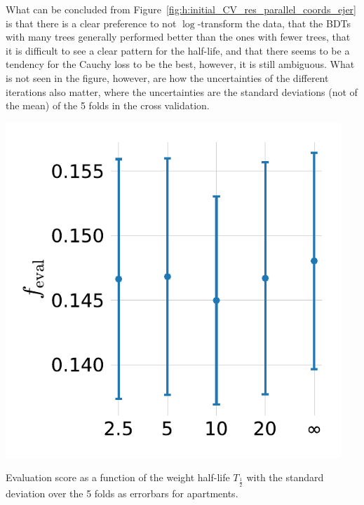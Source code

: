 What can be concluded from Figure~\ref{fig:h:initial_CV_res_parallel_coords_ejer} is that there is a clear preference to not $\log$-transform the data, that the BDTs with many trees generally performed better than the ones with fewer trees, that it is difficult to see a clear pattern for the half-life, and that there seems to be a tendency for the Cauchy loss to be the best, however, it is still ambiguous. What is not seen in the figure, however, are how the uncertainties of the different iterations also matter, where the uncertainties are the standard deviations (not of the mean) of the \num{5} folds in the cross validation.
\begin{marginfigure}[2.5cm]
  \centerfloat
  \includegraphics[width=0.95\textwidth, trim=0 0 0 0, clip]{figures/housing/Ejerlejlighed_v19_cut_all_Ncols_all_MAD_gridsearch_half.pdf}
  \caption[Initial HPO Results for the Weight Half-life $T_{\frac{1}{2}}$]
          {Evaluation score as a function of the weight half-life $T_{\frac{1}{2}}$ with the standard deviation over the \num{5} folds as errorbars for apartments.}
  \label{fig:h:hpo_gridsearch_objective}
\end{marginfigure}

